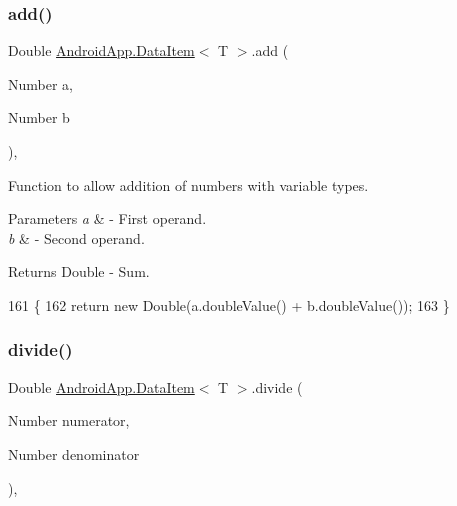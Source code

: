 \subsubsection{\texorpdfstring{add()}{add()}}
{\footnotesize\ttfamily Double \hyperlink{class_android_app_1_1_data_item}{Android\+App.\+Data\+Item}$<$ T $>$.add (\begin{DoxyParamCaption}\item[{Number}]{a,  }\item[{Number}]{b }\end{DoxyParamCaption})\hspace{0.3cm}{\ttfamily [inline]}, {\ttfamily [private]}}



Function to allow addition of numbers with variable types. 


\begin{DoxyParams}{Parameters}
{\em a} & -\/ First operand. \\
\hline
{\em b} & -\/ Second operand. \\
\hline
\end{DoxyParams}
\begin{DoxyReturn}{Returns}
Double -\/ Sum. 
\end{DoxyReturn}

\begin{DoxyCode}
161                                            \{
162         \textcolor{keywordflow}{return} \textcolor{keyword}{new} Double(a.doubleValue() + b.doubleValue());
163     \}
\end{DoxyCode}
\mbox{\label{class_android_app_1_1_data_item_a3c4b68091e69bed9af18df05d6ea26a5}} 
\subsubsection{\texorpdfstring{divide()}{divide()}}
{\footnotesize\ttfamily Double \hyperlink{class_android_app_1_1_data_item}{Android\+App.\+Data\+Item}$<$ T $>$.divide (\begin{DoxyParamCaption}\item[{Number}]{numerator,  }\item[{Number}]{denominator }\end{DoxyParamCaption})\hspace{0.3cm}{\ttfamily [inline]}, {\ttfamily [private]}}



